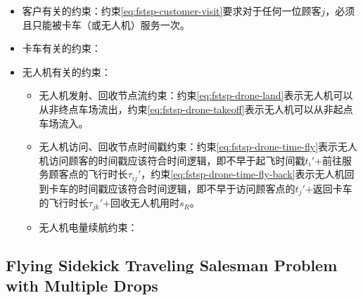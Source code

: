 \begin{itemize}
    \item \colorbox{shallow-green}{客户有关的约束：}约束\ref{eq:fstsp-customer-visit}要求对于任何一位顾客$j$，必须且只能被卡车（或无人机）服务一次。
    \item \colorbox{shallow-purple}{卡车有关的约束：}
    \item \colorbox{shallow-red}{无人机有关的约束：}
    \begin{itemize}
        \item 无人机发射、回收节点流约束：约束\ref{eq:fstsp-drone-land}表示无人机可以从非终点车场流出，约束\ref{eq:fstsp-drone-takeoff}表示无人机可以从非起点车场流入。
        \item 无人机访问、回收节点时间戳约束：约束\ref{eq:fstsp-drone-time-fly}表示无人机访问顾客的时间戳应该符合时间逻辑，即不早于起飞时间戳$t_i'$+前往服务顾客点的飞行时长$\tau_{ij}'$，约束\ref{eq:fstsp-drone-time-fly-back}表示无人机回到卡车的时间戳应该符合时间逻辑，即不早于访问顾客点的$t_j'$+返回卡车的飞行时长$\tau_{jk}'$+回收无人机用时$s_R$。
        \item 无人机电量续航约束：
    \end{itemize}

\end{itemize}



\subsection{Flying Sidekick Traveling Salesman Problem with Multiple Drops}
